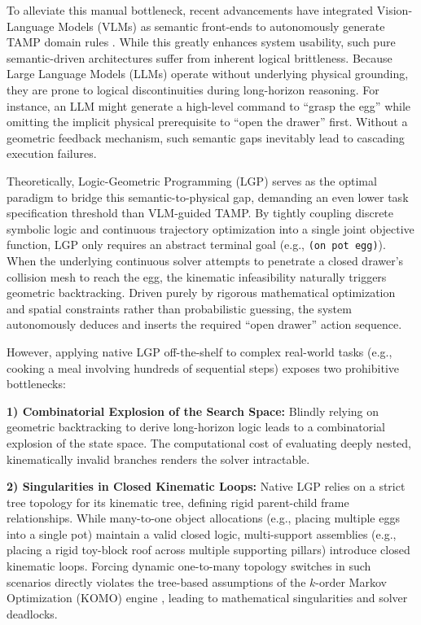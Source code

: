 \documentclass[journal]{IEEEtran}
\begin{document}
  To alleviate this manual bottleneck, recent advancements have integrated Vision-Language
  Models (VLMs) as semantic front-ends to autonomously generate TAMP domain rules
  \cite{cite_arxiv_2410_02193}. While this greatly enhances system usability, such
  pure semantic-driven architectures suffer from inherent logical brittleness.
  Because Large Language Models (LLMs) operate without underlying physical
  grounding, they are prone to logical discontinuities during long-horizon reasoning.
  For instance, an LLM might generate a high-level command to ``grasp the egg'' while
  omitting the implicit physical prerequisite to ``open the drawer'' first.
  Without a geometric feedback mechanism, such semantic gaps inevitably lead to cascading
  execution failures.

  Theoretically, Logic-Geometric Programming (LGP) \cite{cite_lgp_2015} serves
  as the optimal paradigm to bridge this semantic-to-physical gap, demanding an even
  lower task specification threshold than VLM-guided TAMP. By tightly coupling
  discrete symbolic logic and continuous trajectory optimization into a single
  joint objective function, LGP only requires an abstract terminal goal (e.g.,
  \texttt{(on pot egg)}). When the underlying continuous solver attempts to penetrate
  a closed drawer's collision mesh to reach the egg, the kinematic infeasibility
  naturally triggers geometric backtracking. Driven purely by rigorous mathematical
  optimization and spatial constraints rather than probabilistic guessing, the
  system autonomously deduces and inserts the required ``open drawer'' action
  sequence.

  However, applying native LGP off-the-shelf to complex real-world tasks (e.g.,
  cooking a meal involving hundreds of sequential steps) exposes two prohibitive
  bottlenecks:

  \textbf{1) Combinatorial Explosion of the Search Space:} Blindly relying on
  geometric backtracking to derive long-horizon logic leads to a combinatorial
  explosion of the state space. The computational cost of evaluating deeply nested,
  kinematically invalid branches renders the solver intractable.

  \textbf{2) Singularities in Closed Kinematic Loops:} Native LGP relies on a strict
  tree topology for its kinematic tree, defining rigid parent-child frame
  relationships. While many-to-one object allocations (e.g., placing multiple
  eggs into a single pot) maintain a valid closed logic, multi-support
  assemblies (e.g., placing a rigid toy-block roof across multiple supporting pillars)
  introduce closed kinematic loops. Forcing dynamic one-to-many topology switches
  in such scenarios directly violates the tree-based assumptions of the $k$-order
  Markov Optimization (KOMO) engine \cite{cite_komo_2014}, leading to
  mathematical singularities and solver deadlocks.
\end{document}
